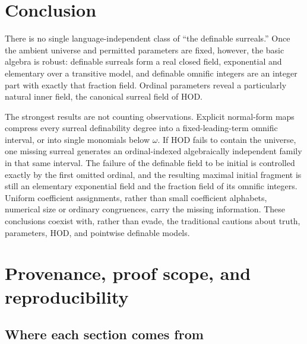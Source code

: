 \documentclass[11pt,a4paper]{article}
\numberwithin{equation}{section}
\theoremstyle{definition}
\theoremstyle{remark}
\newcommand{\HOD}{\mathrm{HOD}}
\begin{document}
\section{Conclusion}

There is no single language-independent class of ``the definable
surreals.'' Once the ambient universe and permitted parameters are
fixed, however, the basic algebra is robust: definable surreals form
a real closed field, exponential and elementary over a transitive model,
and definable omnific integers are an integer part with exactly that
fraction field. Ordinal parameters reveal a particularly natural inner
field, the canonical surreal field of $\HOD$.

The strongest results are not counting observations. Explicit normal-form
maps compress every surreal definability degree into a fixed-leading-term
omnific interval, or into single monomials below $\omega$. If $\HOD$ fails
to contain the universe, one missing surreal generates an ordinal-indexed
algebraically independent family in that same interval. The failure of the
definable field to be initial is controlled exactly by the first omitted
ordinal, and the resulting maximal initial fragment is still an elementary
exponential field and the fraction field of its omnific integers. Uniform
coefficient assignments, rather than small coefficient alphabets, numerical
size or ordinary congruences, carry the missing information. These
conclusions coexist with, rather than evade, the traditional cautions about
truth, parameters, $\HOD$, and pointwise definable models.

\appendix
{}
\section{Provenance, proof scope, and reproducibility}
\label{dsn:app:provenance}

\subsection{Where each section comes from}
\end{document}
